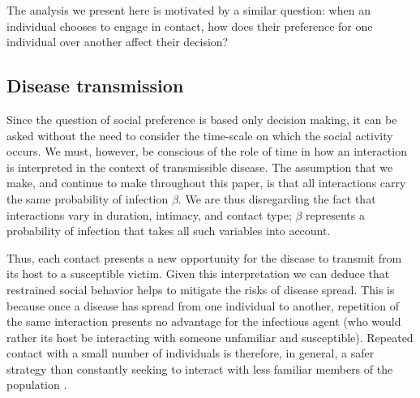 \documentclass[10pt]{article}
\begin{document}
\begin{multicols}{2}
The analysis we present here is motivated by a similar question: when an individual chooses to engage in contact, how does their preference for one individual over another affect their decision? 

\subsection{Disease transmission}
Since the question of social preference is based only decision making, it can be asked without the need to consider the time-scale on which the social activity occurs. We must, however, be conscious of the role of time in how an interaction is interpreted in the context of transmissible disease. The assumption that we make, and continue to make throughout this paper, is that all interactions carry the same probability of infection $\beta$. We are thus disregarding the fact that interactions vary in duration, intimacy, and contact type; $\beta$ represents a probability of infection that takes all such variables into account.

Thus, each contact presents a new opportunity for the disease to transmit from its host to a susceptible victim. Given this interpretation we can deduce that restrained social behavior helps to mitigate the risks of disease spread. This is because once a disease has spread from one individual to another, repetition of the same interaction presents no advantage for the infectious agent (who would rather its host be interacting with someone unfamiliar and susceptible). Repeated contact with a small number of individuals is therefore, in general, a safer strategy than constantly seeking to interact with less familiar members of the population \cite{karsai2014time}. 


\end{multicols}
\end{document}
